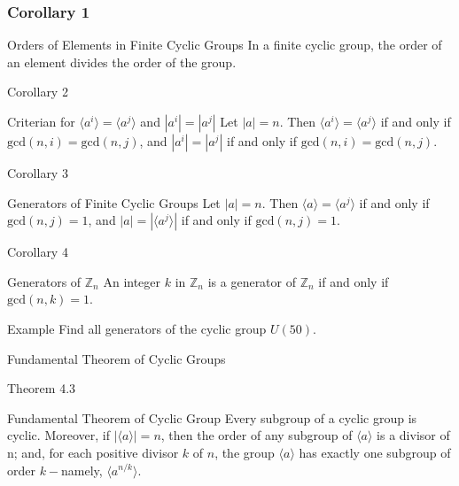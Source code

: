 \documentclass{beamer}
\begin{document}
    \begin{frame}
        \frametitle{Corollary 1}
        \begin{block}{Orders of Elements in Finite Cyclic Groups}
        In a finite cyclic group, the order of an element divides the order of the group. 
        \end{block}
    \end{frame}

    \begin{frame}{Corollary 2}
    \begin{block}{Criterian for \(\langle a^i\rangle = \langle a^j \rangle\) and \(|a^i|=|a^j|\)}   
    Let \(|a|=n\). Then \(\langle a^i \rangle = \langle a^j \rangle\) if and only if \(\text{gcd}(n,i) =\text{gcd}(n,j)\), and \(|a^i|=|a^j|\) if and only if \(\text{gcd}(n,i)=\text{gcd}(n,j)\).
    \end{block}
    \end{frame}

    \begin{frame}{Corollary 3}
    \begin{block}{Generators of Finite Cyclic Groups}
    Let \(|a|=n\). Then \(\langle a\rangle = \langle a^j\rangle\) if and only if \(\text{gcd}(n,j)=1\), and \(|a|=|\langle a^j\rangle|\) if and only if \(\text{gcd}(n,j)=1\).
    \end{block}
    \end{frame}

    \begin{frame}{Corollary 4}
    \begin{block}{Generators of \(\mathbb{Z}_n\)} 
    An integer \(k\) in \(\mathbb{Z}_n\) is a generator of \(\mathbb{Z}_n\) if and only if \(\text{gcd}(n,k)=1\).
    \end{block}
    \end{frame}

    \begin{frame}{Example}
    Find all generators of the cyclic group \(U(50)\).
    \end{frame}

    \begin{frame}{}
    \begin{center}
        \Huge{Fundamental Theorem of Cyclic Groups}
    \end{center}
    \end{frame}

    \begin{frame}{Theorem 4.3}
    \begin{block}{Fundamental Theorem of Cyclic Group}
        Every subgroup of a cyclic group is cyclic. Moreover, if \(|\langle a \rangle|=n\), then  the order of any subgroup of \(\langle a\rangle\) is a divisor of n; and, for each positive divisor \(k\) of \(n\), the group \(\langle a\rangle\) has exactly one subgroup of order \(k-\)namely, \(\langle a^{n/k}\rangle\). 
    \end{block}
    \end{frame}
\end{document}

